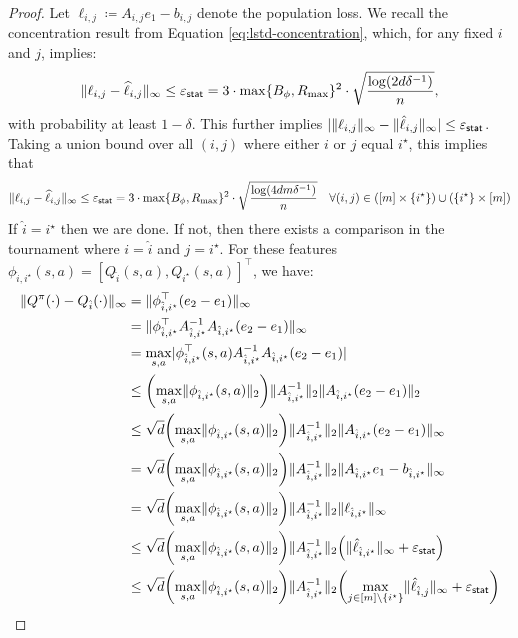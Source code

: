 \begin{proof}
Let $\ell_{i,j} \coloneqq A_{i,j}e_1 - b_{i,j}$ denote the population loss. We recall the concentration result from Equation \eqref{eq:lstd-concentration}, which, for any fixed $i$ and $j$, implies:
\[
  \nbr{\ell_{i,j} - \ellhat_{i,j}}_{\infty} \le \vepsstat = 3\cdot \max\{B_\phi, \Rmax\}^2 \cdot \sqrt{\frac{\log(2d\delta^{-1})}{n}},
\]
with probability at least $1-\delta$. This further implies $\abs{\nrm{\ell_{i,j}}_{\infty} - \nrm{\hat{\ell}_{i,j}}_{\infty}} \leq \vepsstat$. Taking a union bound over all $(i,j)$ where either $i$ or $j$ equal $i^\star$, this implies that
\[
\nbr{\ell_{i,j} - \ellhat_{i,j}}_{\infty} \le \vepsstat = 3\cdot \max\{B_\phi, \Rmax\}^2 \cdot \sqrt{\frac{\log(4dm\delta^{-1})}{n}} \quad \forall (i,j) \in \prn*{[m] \times \{i^\star\}} \cup \prn*{\{i^\star\} \times [m]}
\]
If $\hat{i} = i^\star$ then we are done. If not, then there exists a comparison in the tournament where $i = \hat{i}$ and $j = i^\star$. For these features $\phi_{\hat{i},i^\star}(s,a) = [Q_{\hat{i}}(s,a), Q_{i^\star}(s,a)]^\top$, we have:
\begin{align}
 \nrm{Q^{\pi}(\cdot) - Q_{\hat{i}}(\cdot)}_\infty &=  \nrm{\phi^\top_{\hat{i},i^\star}(e_2 - e_1)}_\infty\\
 &= \nrm{\phi^\top_{\hat{i},i^\star}A^{-1}_{\hat{i},i^\star} A_{\hat{i},i^\star}(e_2-e_1)}_\infty\\
 &= \max_{s,a} \abs{\phi^\top_{\hat{i},i^\star}(s,a)A^{-1}_{\hat{i},i^\star} A_{\hat{i},i^\star}(e_2-e_1)} \\
 &\leq \prn*{\max_{s,a}\nrm{\phi_{\hat{i},i^\star}(s,a)}_2}\nrm{A^{-1}_{\hat{i},i^\star}}_2\nrm{A_{\hat{i},i^\star}(e_2-e_1)}_2\\
 &\leq \sqrt{d}\prn*{\max_{s,a}\nrm{\phi_{\hat{i},i^\star}(s,a)}_2}\nrm{A^{-1}_{\hat{i},i^\star}}_2\nrm{A_{\hat{i},i^\star}(e_2-e_1)}_\infty\\
 &= \sqrt{d}\prn*{\max_{s,a}\nrm{\phi_{\hat{i},i^\star}(s,a)}_2}\nrm{A^{-1}_{\hat{i},i^\star}}_2\nrm{A_{\hat{i},i^\star}e_1 - b_{\hat{i},i^\star}}_\infty\\
  &= \sqrt{d}\prn*{\max_{s,a}\nrm{\phi_{\hat{i},i^\star}(s,a)}_2}\nrm{A^{-1}_{\hat{i},i^\star}}_2\nrm{\ell_{\hat{i},i^\star}}_\infty\\
  &\leq \sqrt{d}\prn*{\max_{s,a}\nrm{\phi_{\hat{i},i^\star}(s,a)}_2}\nrm{A^{-1}_{\hat{i},i^\star}}_2\prn*{\nrm{\hat{\ell}_{\hat{i},i^\star}}_\infty + \vepsstat}\\
  &\leq \sqrt{d}\prn*{\max_{s,a}\nrm{\phi_{\hat{i},i^\star}(s,a)}_2}\nrm{A^{-1}_{\hat{i},i^\star}}_2\prn*{\max_{j \in [m]\setminus\crl{i^\star}}\nrm{\hat{\ell}_{\hat{i},j}}_\infty + \vepsstat}\\

\end{align}
\end{proof}
